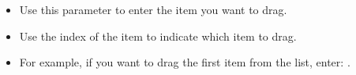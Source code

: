 
\begin{itemize}
\item Use this parameter to enter the item you want to drag.
\item Use the index of the item to indicate which item to drag.
\item For example, if you want to drag the first item from the list, enter: .
\end{itemize}

      
